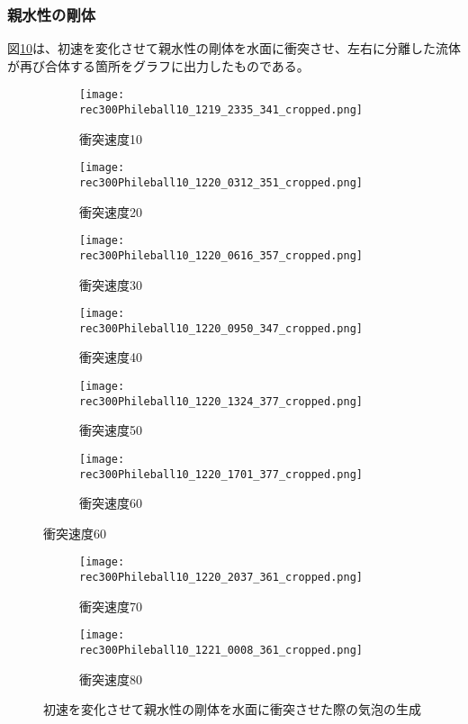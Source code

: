 \documentclass[]{jsarticle}
\begin{document}
\subsubsection{親水性の剛体}
図\ref{fig:hydrophilic}は、初速を変化させて親水性の剛体を水面に衝突させ、左右に分離した流体が再び合体する箇所をグラフに出力したものである。
\begin{figure}[H]
  \centering
\begin{subfigure}{0.3\columnwidth}
  \centering
  \texttt{[image: rec300Phileball10\_1219\_2335\_341\_cropped.png]}
  \caption{衝突速度10}
  \label{fig:philevel10}
\end{subfigure}
\begin{subfigure}{0.3\columnwidth}
  \centering
  \texttt{[image: rec300Phileball10\_1220\_0312\_351\_cropped.png]}
  \caption{衝突速度20}
  \label{fig:philevel20}
\end{subfigure}
\begin{subfigure}{0.3\columnwidth}
  \centering
  \texttt{[image: rec300Phileball10\_1220\_0616\_357\_cropped.png]}
  \caption{衝突速度30}
  \label{fig:philevel30}
\end{subfigure}
\begin{subfigure}{0.3\columnwidth}
  \centering
  \texttt{[image: rec300Phileball10\_1220\_0950\_347\_cropped.png]}
  \caption{衝突速度40}
  \label{fig:philevel40}
\end{subfigure}
\begin{subfigure}{0.3\columnwidth}
  \centering
  \texttt{[image: rec300Phileball10\_1220\_1324\_377\_cropped.png]}
  \caption{衝突速度50}
  \label{fig:philevel50}
\end{subfigure}
\begin{subfigure}{0.3\columnwidth}
  \centering
  \texttt{[image: rec300Phileball10\_1220\_1701\_377\_cropped.png]}
  \caption{衝突速度60}
  \label{fig:philevel60}
\end{subfigure}
\end{figure}
\clearpage
\begin{figure}
\ContinuedFloat
  \begin{subfigure}{0.3\columnwidth}
  \centering
  \texttt{[image: rec300Phileball10\_1220\_2037\_361\_cropped.png]}
  \caption{衝突速度70}
  \label{fig:philevel70}
\end{subfigure}
\begin{subfigure}{0.3\columnwidth}
  \centering
  \texttt{[image: rec300Phileball10\_1221\_0008\_361\_cropped.png]}
  \caption{衝突速度80}
  \label{fig:philevel80}
\end{subfigure}
\caption{初速を変化させて親水性の剛体を水面に衝突させた際の気泡の生成}
\label{fig:hydrophilic}
\end{figure}
\end{document}
